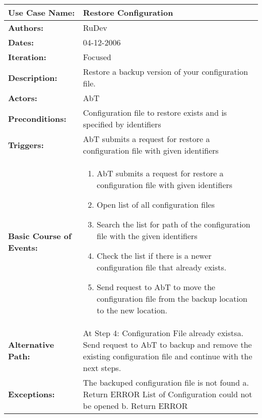 \begin{tabularx}{\linewidth}{|l|X|}
\hline
\textbf{Use Case Name:} & \textbf{Restore Configuration} \\
\hline
\textbf{Authors:} & RuDev \\
\hline
\textbf{Dates:} & 04-12-2006 \\
\hline
\textbf{Iteration:} & Focused \\
\hline
\textbf{Description:} & Restore a backup version of your configuration file. \\
\hline
\textbf{Actors:} & AbT \\
\hline
\textbf{Preconditions:} & Configuration file to restore exists and is specified by identifiers \\
\hline
\textbf{Triggers:} & AbT submits a request for restore a configuration file with given identifiers \\
\hline
\textbf{Basic Course of Events:} & 
\begin{minipage}{\linewidth} 
  \vspace{0.05em}
  \begin{enumerate}
   \item AbT submits a request for restore a configuration file with given identifiers
   \item Open list of all configuration files
   \item Search the list for path of the configuration file with the given identifiers
   \item Check the list if there is a newer configuration file that already exists.
   \item Send request to AbT to move the configuration file from the backup location to the new location.
  \end{enumerate}
  \vspace{0.05em}
\end{minipage}
\\
\hline 
\textbf{Alternative Path:} & At Step 4: Configuration File already exists\newline a. Send request to AbT to backup and remove the existing configuration file and continue with the next steps.  \\
\hline
\textbf{Exceptions:} & The backuped configuration file is not found \newline a. Return ERROR \newline\newline List of Configuration could not be opened \newline b. Return ERROR \\

\end{tabularx}
